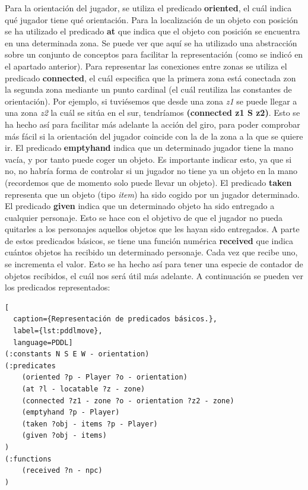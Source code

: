 \documentclass[11pt,a4paper]{article}
\begin{document}
Para la orientación del jugador, se utiliza el predicado \textbf{oriented}, el cuál indica qué jugador tiene qué orientación. Para
la localización de un objeto con posición se ha utilizado el predicado \textbf{at} que indica que el objeto con posición se encuentra
en una determinada zona. Se puede ver que aquí se ha utilizado una abstracción sobre un conjunto de conceptos para facilitar la
representación (como se indicó en el apartado anterior). Para representar las conexiones entre zonas se utiliza el predicado
\textbf{connected}, el cuál especifica que la primera zona está conectada zon la segunda zona mediante un punto cardinal (el cuál
reutiliza las constantes de orientación). Por ejemplo, si tuviésemos que desde una zona \textit{z1} se puede llegar a una zona
\textit{z2} la cuál se sitúa en el sur, tendríamos \textbf{(connected z1 S z2)}. Esto se ha hecho así para facilitar más adelante la
acción del giro, para poder comprobar más fácil si la orientación del jugador coincide con la de la zona a la que se quiere ir. El
predicado \textbf{emptyhand} indica que un determinado jugador tiene la mano vacía, y por tanto puede coger un objeto. Es importante
indicar esto, ya que si no, no habría forma de controlar si un jugador no tiene ya un objeto en la mano (recordemos que de momento
solo puede llevar un objeto). El predicado \textbf{taken} representa que un objeto (tipo \textit{item}) ha sido cogido por un jugador
determinado. El predicado \textbf{given} indica que un determinado objeto ha sido entregado a cualquier personaje. Esto se hace con el
objetivo de que el jugador no pueda quitarles a los personajes aquellos objetos que les hayan sido entregados. A parte de estos
predicados básicos, se tiene una función numérica \textbf{received} que indica cuántos objetos ha recibido un determinado personaje.
Cada vez que recibe uno, se incrementa el valor. Esto se ha hecho así para tener una especie de contador de objetos recibidos, el cuál
nos será útil más adelante. A continuación se pueden ver los predicados representados:

\begin{algorithm}[H]
\begin{lstlisting}[
  caption={Representación de predicados básicos.},
  label={lst:pddlmove},
  language=PDDL]
(:constants N S E W - orientation)
(:predicates
	(oriented ?p - Player ?o - orientation)
  	(at ?l - locatable ?z - zone)
  	(connected ?z1 - zone ?o - orientation ?z2 - zone)
  	(emptyhand ?p - Player)
  	(taken ?obj - items ?p - Player)
  	(given ?obj - items)
)
(:functions
  	(received ?n - npc)
)
\end{lstlisting}
\end{algorithm}
\end{document}

